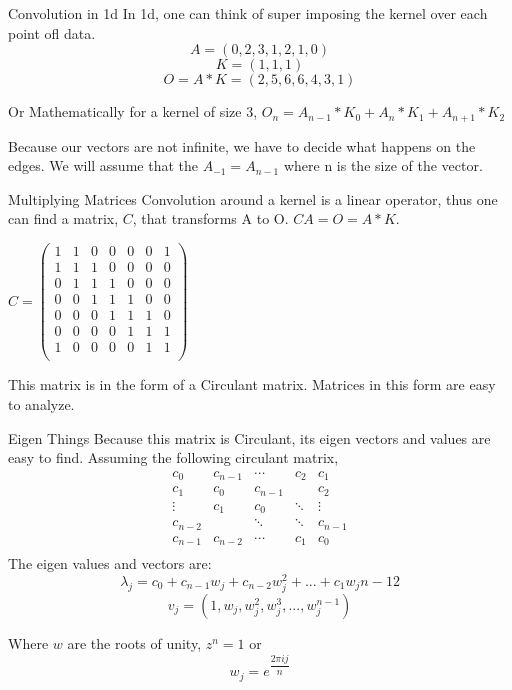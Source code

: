 \documentclass{beamer}
\begin{document}
\begin{frame} {Convolution in 1d}
In 1d, one can think of super imposing the kernel over each point ofl data.
$$A = (0,2,3,1,2,1,0)$$
$$K = (1,1,1)$$ 
$$O = A*K = (2,5,6,6,4,3,1)$$

Or Mathematically for a kernel of size 3, $O_n = A_{n-1}*K_{0}+A_{n}*K_{1}+A_{n+1}*K_{2}$

Because our vectors are not infinite, we have to decide what happens on the edges. We will assume that the $A_{-1} = A_{n-1}$ where n is the size of the vector.
\end{frame}


\begin{frame}{Multiplying Matrices}
Convolution around a kernel is a linear operator, thus one can find a matrix, $C$, that transforms A to O. $CA=O=A*K$.

$C = \begin{pmatrix}
	1 & 1 & 0 & 0 & 0 & 0 & 1\\
	1 & 1 & 1 & 0 & 0 & 0 & 0\\
	0 & 1 & 1 & 1 & 0 & 0 & 0\\
	0 & 0 & 1 & 1 & 1 & 0 & 0\\
	0 & 0 & 0 & 1 & 1 & 1 & 0\\
	0 & 0 & 0 & 0 & 1 & 1 & 1\\
	1 & 0 & 0 & 0 & 0 & 1 & 1\\
\end{pmatrix}$

This matrix is in the form of a Circulant matrix. Matrices in this form are easy to analyze.

\end{frame}


\begin{frame}{Eigen Things}
Because this matrix is Circulant, its eigen vectors and values are easy to find. 
Assuming the following circulant matrix, 
$$\begin{matrix}
	c_0 & c_{n-1} & \cdots & c_2 & c_1\\
	c_1 & c_0 & c_{n-1} &  & c_2\\
	\vdots & c_1 & c_0 & \ddots & \vdots\\
	c_{n-2} &   & \ddots & \ddots & c_{n-1}\\
	c_{n-1} & c_{n-2} & \cdots & c_1 & c_0\\
\end{matrix}$$
The eigen values and vectors are:
$$\lambda_j =c_0+c_{n-1}w_j	+c_{n-2}w_j^2+...+c_{1}w_j{n-1}2$$
$$v_j = (1, w_j, w_j^2, w_j^3, ..., w_j^{n-1})$$

Where $w$ are the roots of unity, $z^n = 1$ or 
$$w_j = e^{\dfrac{2\pi i j}{n}}$$

\end{frame}
\end{document}
